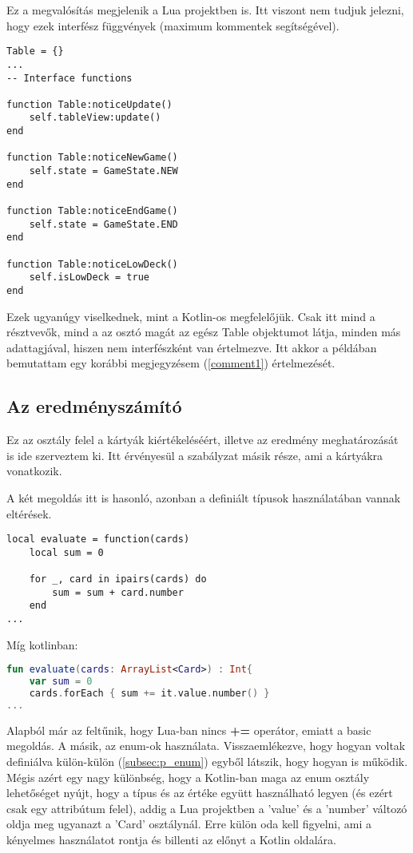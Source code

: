 Ez a megvalósítás megjelenik a Lua projektben is. Itt viszont nem tudjuk jelezni, hogy ezek interfész függvények (maximum kommentek segítségével).
\scriptsize
\begin{lstlisting}[style=Lua]
Table = {}
...
-- Interface functions

function Table:noticeUpdate()
	self.tableView:update()
end

function Table:noticeNewGame()
	self.state = GameState.NEW
end

function Table:noticeEndGame()
	self.state = GameState.END
end

function Table:noticeLowDeck()
	self.isLowDeck = true
end
\end{lstlisting}
\normalsize
Ezek ugyanúgy viselkednek, mint a Kotlin-os megfelelőjük. Csak itt mind a résztvevők, mind a az osztó magát az egész Table objektumot látja, minden más adattagjával, hiszen nem interfészként van értelmezve. Itt akkor a példában bemutattam egy korábbi megjegyzésem (\ref{comment1}) értelmezését. 

\subsection{Az eredményszámító}

Ez az osztály felel a kártyák kiértékeléséért, illetve az eredmény meghatározását is ide szerveztem ki. Itt érvényesül a szabályzat másik része, ami a kártyákra vonatkozik.

A két megoldás itt is hasonló, azonban a definiált típusok használatában vannak eltérések.
\scriptsize
\begin{lstlisting}[style=Lua]
local evaluate = function(cards)
	local sum = 0
	
	for _, card in ipairs(cards) do
		sum = sum + card.number
	end
...
\end{lstlisting}
\normalsize
Míg kotlinban:
\scriptsize
\begin{lstlisting}[language = Kotlin]
fun evaluate(cards: ArrayList<Card>) : Int{
	var sum = 0
	cards.forEach { sum += it.value.number() }
...
\end{lstlisting}
\normalsize
Alapból már az feltűnik, hogy Lua-ban nincs \textbf{+=} operátor, emiatt a basic megoldás. A másik, az enum-ok használata. Visszaemlékezve, hogy hogyan voltak definiálva külön-külön (\ref{subsec:p_enum}) egyből látszik, hogy hogyan is működik. Mégis azért egy nagy különbség, hogy a Kotlin-ban maga az enum osztály lehetőséget nyújt, hogy a típus és az értéke együtt használható legyen (és ezért csak egy attribútum felel), addig a Lua projektben a 'value' és a 'number' változó oldja meg ugyanazt a 'Card' osztálynál. Erre külön oda kell figyelni, ami a kényelmes használatot rontja és billenti az előnyt a Kotlin oldalára.

